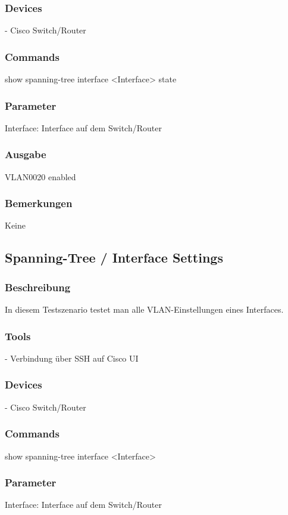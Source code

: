 \documentclass[a4,12pt]{scrartcl}
\begin{document}
\subsubsection{Devices}
- Cisco Switch/Router
\subsubsection{Commands}
show spanning-tree interface <Interface> state
\subsubsection{Parameter}
Interface: Interface auf dem Switch/Router
\subsubsection{Ausgabe}
VLAN0020            enabled
\subsubsection{Bemerkungen}
Keine


\subsection{Spanning-Tree / Interface Settings}
\subsubsection{Beschreibung}
In diesem Testszenario testet man alle VLAN-Einstellungen eines Interfaces.
\subsubsection{Tools}
- Verbindung über SSH auf Cisco UI
\subsubsection{Devices}
- Cisco Switch/Router
\subsubsection{Commands}
show spanning-tree interface <Interface>
\subsubsection{Parameter}
Interface: Interface auf dem Switch/Router
\end{document}
